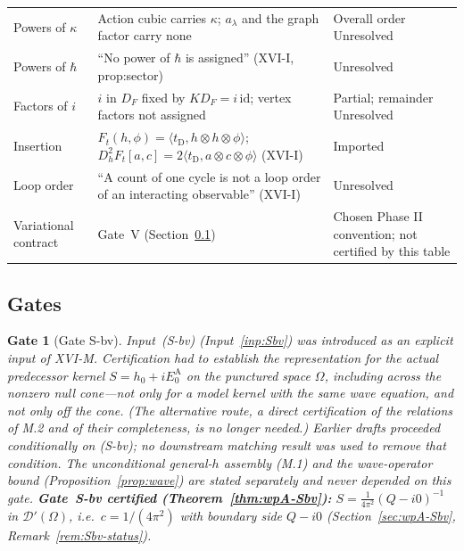 \documentclass{article}
\newtheorem{gate}[proposition]{Gate}
\theoremstyle{remark}
\begin{document}
\begin{center}
\begin{longtable}{p{}p{}p{}}
Powers of $\kappa$ & Action cubic carries $\kappa$; $a_\lambda$ and the graph factor carry none & Overall order Unresolved\\
Powers of $\hbar$ & ``No power of $\hbar$ is assigned'' (XVI-I, prop:sector) & Unresolved\\
Factors of $i$ & $i$ in $D_F$ fixed by $KD_F=i\,\mathrm{id}$; vertex factors not assigned & Partial; remainder Unresolved\\
Insertion & $F_t(h,\phi)=\langle t_{\mathrm D},h\otimes h\otimes\phi\rangle$; $D_h^2F_t[a,c]=2\langle t_{\mathrm D},a\otimes c\otimes\phi\rangle$ (XVI-I) & Imported\\
Loop order & ``A count of one cycle is not a loop order of an interacting observable'' (XVI-I) & Unresolved\\
Variational contract & Gate~V (Section~\ref{sec:gates}) & Chosen Phase II convention; not certified by this table\\
\hline
\end{longtable}
\end{center}

\subsection{Gates}
\label{sec:gates}

\begin{gate}[Gate S-bv]
\label{gate:Sbv}
Input~(S-bv) (Input~\ref{inp:Sbv}) was introduced as an explicit input of XVI-M.
Certification had to establish the representation for the \emph{actual predecessor kernel} $S=h_0+iE_0^{\mathrm A}$ on the punctured space $\Omega$, including across the nonzero null cone---not only for a model kernel with the same wave equation, and not only off the cone.
(The alternative route, a direct certification of the relations of M.2 and of their completeness, is no longer needed.)
Earlier drafts proceeded conditionally on (S-bv); no downstream matching result was used to remove that condition.
The unconditional general-$h$ assembly (M.1) and the wave-operator bound (Proposition~\ref{prop:wave}) are stated separately and never depended on this gate.
\textbf{Gate~S-bv certified (Theorem~\ref{thm:wpA-Sbv}):} $S=\frac1{4\pi^2}(Q-i0)^{-1}$ in $\mathcal D'(\Omega)$, i.e.\ $c=1/(4\pi^2)$ with boundary side $Q-i0$ (Section~\ref{sec:wpA-Sbv}, Remark~\ref{rem:Sbv-status}).
\end{gate}
\end{document}
